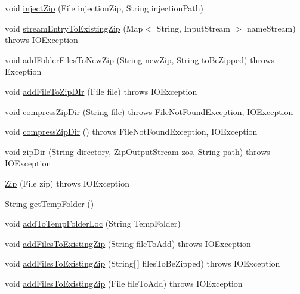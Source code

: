 \begin{DoxyCompactItemize}
\item 
void \hyperlink{class_c_a_s_u_a_l_1_1archiving_1_1_zip_ae822ac657cc2f6ecda6789a9fb5dd03a}{inject\-Zip} (File injection\-Zip, String injection\-Path)
\item 
void \hyperlink{class_c_a_s_u_a_l_1_1archiving_1_1_zip_ae77b937fded9d3d6d0a2cf8759ab6b93}{stream\-Entry\-To\-Existing\-Zip} (Map$<$ String, Input\-Stream $>$ name\-Stream)  throws I\-O\-Exception 
\item 
void \hyperlink{class_c_a_s_u_a_l_1_1archiving_1_1_zip_a5f5fae25d91196d11da0e6387dfbba97}{add\-Folder\-Files\-To\-New\-Zip} (String new\-Zip, String to\-Be\-Zipped)  throws Exception 
\item 
void \hyperlink{class_c_a_s_u_a_l_1_1archiving_1_1_zip_a4d9cc06f35c9d8ffcece89cec48e045b}{add\-File\-To\-Zip\-D\-Ir} (File file)  throws I\-O\-Exception 
\item 
void \hyperlink{class_c_a_s_u_a_l_1_1archiving_1_1_zip_a42720ff4df86cf4f26b465a7c078fb75}{compress\-Zip\-Dir} (String file)  throws File\-Not\-Found\-Exception, I\-O\-Exception 
\item 
void \hyperlink{class_c_a_s_u_a_l_1_1archiving_1_1_zip_a8e9092ce77563c5b450d1e9c5c56a872}{compress\-Zip\-Dir} ()  throws File\-Not\-Found\-Exception, I\-O\-Exception 
\item 
void \hyperlink{class_c_a_s_u_a_l_1_1archiving_1_1_zip_a265a180ad36454517d139b18d1e0ef45}{zip\-Dir} (String directory, Zip\-Output\-Stream zos, String path)  throws I\-O\-Exception 
\item 
\hyperlink{class_c_a_s_u_a_l_1_1archiving_1_1_zip_af739cb60ce5a0d3a5348cb9e679ceba7}{Zip} (File zip)  throws I\-O\-Exception 
\item 
String \hyperlink{class_c_a_s_u_a_l_1_1archiving_1_1_zip_a0e55040227d73b64d691017a57e88c30}{get\-Temp\-Folder} ()
\item 
void \hyperlink{class_c_a_s_u_a_l_1_1archiving_1_1_zip_aa1bf6893e99618dfc73e5e15d90a233e}{add\-To\-Temp\-Folder\-Loc} (String Temp\-Folder)
\item 
void \hyperlink{class_c_a_s_u_a_l_1_1archiving_1_1_zip_a2a84e31123f657e9c5e6cc73bcf85fc0}{add\-Files\-To\-Existing\-Zip} (String file\-To\-Add)  throws I\-O\-Exception 
\item 
void \hyperlink{class_c_a_s_u_a_l_1_1archiving_1_1_zip_aacdd5cd6f2847e0ee6bb77ea202ecdab}{add\-Files\-To\-Existing\-Zip} (String\mbox{[}$\,$\mbox{]} files\-To\-Be\-Zipped)  throws I\-O\-Exception 
\item 
void \hyperlink{class_c_a_s_u_a_l_1_1archiving_1_1_zip_a9dc2f94fce74e938b6f529cdf300ad91}{add\-Files\-To\-Existing\-Zip} (File file\-To\-Add)  throws I\-O\-Exception 

\end{DoxyCompactItemize}
